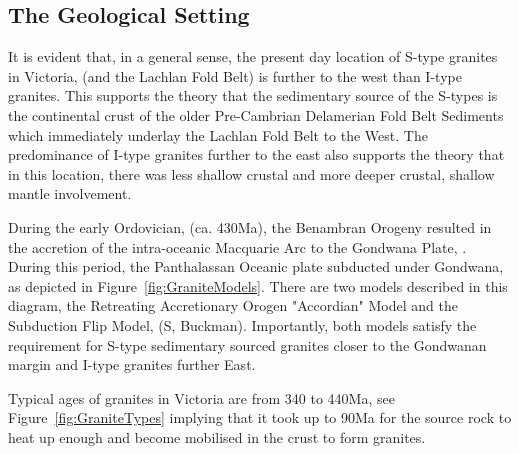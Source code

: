 \documentclass[a4paper]{article}
\begin{document}
\subsection{The Geological Setting}

It is evident that, in a general sense, the present day location of S-type granites in Victoria, (and the Lachlan Fold Belt) is further to the west than I-type granites. This supports the theory that the sedimentary source of the S-types is the continental crust of the older Pre-Cambrian Delamerian Fold Belt Sediments which immediately underlay the Lachlan Fold Belt to the West. The predominance of I-type granites further to the east also supports the theory that in this location, there was less shallow crustal and more deeper crustal, shallow mantle involvement.

During the early Ordovician, (ca. 430Ma), the Benambran Orogeny resulted in the accretion of the intra-oceanic Macquarie Arc to the Gondwana Plate, \cite{BenambranOrogeny}.  During this period, the Panthalassan Oceanic plate subducted under Gondwana, as depicted in  Figure~\ref{fig:GraniteModels}. There are two models described in this diagram, the Retreating Accretionary Orogen "Accordian" Model and the Subduction Flip Model, (S, Buckman). Importantly, both models satisfy the requirement for S-type sedimentary sourced granites closer to the Gondwanan margin and I-type granites further East.

Typical ages of granites in Victoria are from 340 to 440Ma, see  Figure~\ref{fig:GraniteTypes} implying that it took up to 90Ma for the source rock to heat up enough and become mobilised in the crust to form granites.
\end{document}
